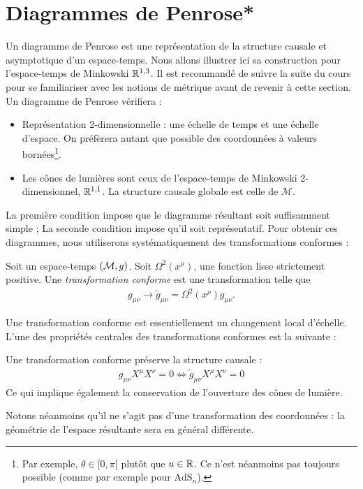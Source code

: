 {\section{Diagrammes de Penrose*}
Un diagramme de Penrose est une représentation de la structure causale et asymptotique d'un espace-temps. Nous allons illustrer ici sa construction pour l'espace-temps de Minkowski $\mathbb{R}^{1,3}$. Il est recommandé de suivre la suite du cours pour se familiariser avec les notions de métrique avant de revenir à cette section. Un diagramme de Penrose vérifiera :
\begin{itemize}
    \item Représentation 2-dimensionnelle : une échelle de temps et une échelle d'espace. On préfèrera autant que possible des coordonnées à valeurs bornées\footnote{Par exemple, $\theta \in [0,\pi[$ plutôt que $u \in \mathbb{R}$. Ce n'est néanmoins pas toujours possible (comme par exemple pour $\mathrm{AdS}_n$).}.
    \item Les cônes de lumières sont ceux de l'espace-temps de Minkowski 2-dimensionnel, $\mathbb{R}^{1,1}$. La structure causale globale est celle de $\mathcal{M}$.
\end{itemize}
La première condition impose que le diagramme résultant soit suffisamment simple ; La seconde condition impose qu'il soit représentatif. Pour obtenir ces diagrammes, nous utiliserons systématiquement des transformations conformes :
\begin{theoremframe}
    \begin{defi}
        Soit un espace-temps $(\mathcal{M},g)$. Soit $\Omega^2(x^\mu)$, une fonction lisse strictement positive. Une \emph{transformation conforme} est une transformation telle que
        \begin{align}
            g_{\mu\nu} \to \tilde{g}_{\mu\nu} = \Omega^2(x^\rho) g_{\mu\nu}.
        \end{align}
    \end{defi}
\end{theoremframe}
Une transformation conforme est essentiellement un changement local d'échelle. L'une des propriétés centrales des transformations conformes est la suivante :
\begin{propri}
    Une transformation conforme préserve la structure causale :
    \begin{align}
        g_{\mu\nu}X^\mu X^\nu = 0 \iff \tilde{g}_{\mu\nu}X^\mu X^\nu = 0 
    \end{align}
    Ce qui implique également la conservation de l'ouverture des cônes de lumière.
\end{propri}
Notons néanmoins qu'il ne s'agit pas d'une transformation des coordonnées : la géométrie de l'espace résultante sera en général différente. 
}
